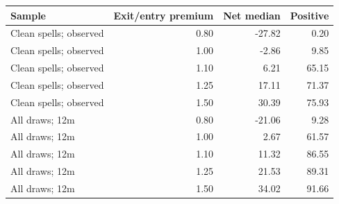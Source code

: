 \begin{tabular}{lrrr}
\toprule
Sample & Exit/entry premium & Net median & Positive \\
\midrule
Clean spells; observed & 0.80 & -27.82 & 0.20 \\
Clean spells; observed & 1.00 & -2.86 & 9.85 \\
Clean spells; observed & 1.10 & 6.21 & 65.15 \\
Clean spells; observed & 1.25 & 17.11 & 71.37 \\
Clean spells; observed & 1.50 & 30.39 & 75.93 \\
All draws; 12m & 0.80 & -21.06 & 9.28 \\
All draws; 12m & 1.00 & 2.67 & 61.57 \\
All draws; 12m & 1.10 & 11.32 & 86.55 \\
All draws; 12m & 1.25 & 21.53 & 89.31 \\
All draws; 12m & 1.50 & 34.02 & 91.66 \\
\bottomrule
\end{tabular}
